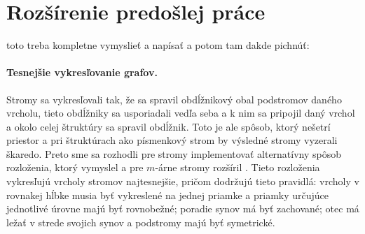 \section{Rozšírenie predošlej práce}

toto treba kompletne vymyslieť a napísať a potom tam dakde pichnúť:

\paragraph{Tesnejšie vykresľovanie grafov.}
Stromy sa vykresľovali tak, že sa spravil obdĺžnikový obal podstromov daného 
vrcholu, tieto obdĺžniky sa usporiadali vedľa seba a k nim sa pripojil daný 
vrchol a okolo celej štruktúry sa spravil obdĺžnik. Toto je ale spôsob, ktorý 
nešetrí priestor a pri štruktúrach ako písmenkový strom by výsledné stromy 
vyzerali škaredo. Preto sme sa rozhodli pre stromy implementovať 
alternatívny spôsob rozloženia, ktorý vymyslel \citet{reingold} a pre $m$-árne 
stromy rozšíril \citet{walker}. Tieto rozloženia vykresľujú vrcholy stromov 
najtesnejšie, pričom dodržujú tieto pravidlá: vrcholy v rovnakej hĺbke musia 
byť vykreslené na jednej priamke a priamky určujúce jednotlivé úrovne majú byť 
rovnobežné; poradie synov má byť zachované; otec má ležať v strede svojich 
synov a podstromy majú byť symetrické.
